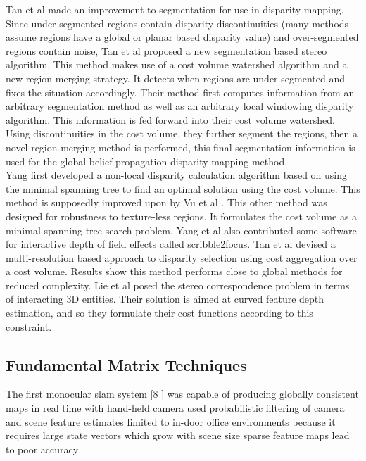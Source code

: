 Tan et al \cite{Tan14Stereo} made an improvement to segmentation for use in disparity mapping. Since under-segmented regions contain disparity discontinuities (many methods assume regions have a global or planar based disparity value) and over-segmented regions contain noise, Tan et al proposed a new segmentation based stereo algorithm. This method makes use of a cost volume watershed algorithm and a new region merging strategy. It detects when regions are under-segmented and fixes the situation accordingly. Their method first computes information from an arbitrary segmentation method as well as an arbitrary local windowing disparity algorithm. This information is fed forward into their cost volume watershed. Using discontinuities in the cost volume, they further segment the regions, then a novel region merging method is performed, this final segmentation information is used for the global belief propagation disparity mapping method. \\


Yang \cite{Yang14Pattern} first developed a non-local disparity calculation algorithm based on using the minimal spanning tree to find an optimal solution using the cost volume. This method is supposedly improved upon by Vu et al \cite{Vu14Efficient}. This other method was designed for robustness to texture-less regions. It formulates the cost volume as a minimal spanning tree search problem. Yang et al also contributed some software for interactive depth of field effects called scribble2focus. Tan et al \cite{Tan14Soft} devised a multi-resolution based approach to disparity selection using cost aggregation over a cost volume. Results show this method performs close to global methods for reduced complexity. Lie et al \cite{Liu143d} posed the stereo correspondence problem in terms of interacting 3D entities. Their solution is aimed at curved feature depth estimation, and so they formulate their cost functions according to this constraint. \\



\subsection{Fundamental Matrix Techniques}

The first monocular slam system [8 \cite{Davison03Real} ] was capable of producing globally consistent maps in real time with hand-held camera used probabilistic filtering of camera and scene feature estimates
limited to in-door office environments because it requires large state vectors which grow with scene size
sparse feature maps lead to poor accuracy

